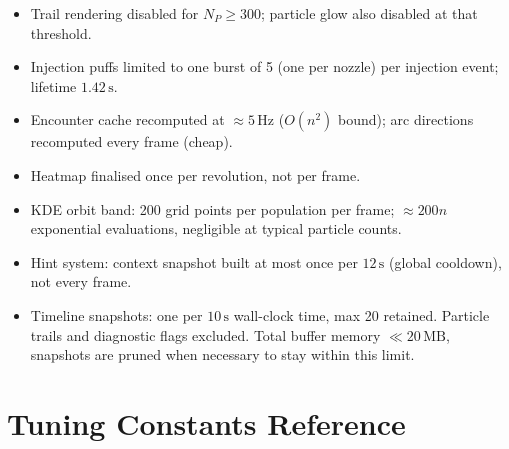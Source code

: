 \documentclass[12pt, a4paper]{article}
\begin{document}
\begin{itemize}
  \item Trail rendering disabled for $N_P \geq 300$; particle glow also
    disabled at that threshold.
  \item Injection puffs limited to one burst of 5 (one per nozzle) per
    injection event; lifetime $1.42\,\mathrm{s}$.
  \item Encounter cache recomputed at $\approx 5\,\mathrm{Hz}$
    ($O(n^2)$ bound); arc directions recomputed every frame (cheap).
  \item Heatmap finalised once per revolution, not per frame.
  \item KDE orbit band: 200 grid points per population per frame;
    $\approx 200n$ exponential evaluations, negligible at typical
    particle counts.
  \item Hint system: context snapshot built at most once per $12\,\mathrm{s}$
    (global cooldown), not every frame.
  \item Timeline snapshots: one per $10\,\mathrm{s}$ wall-clock time, max 20
    retained. Particle trails and diagnostic flags excluded. Total buffer
    memory $\ll 20\,\mathrm{MB}$, snapshots are pruned when necessary
    to stay within this limit.
\end{itemize}

\appendix

\section{Tuning Constants Reference}
\label{app:tuning}
\end{document}
